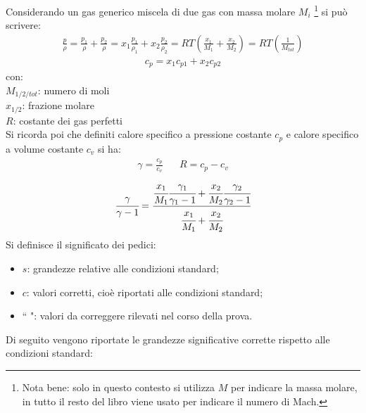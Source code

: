 Considerando un gas generico miscela di due gas con massa molare $M_i$ \footnote{Nota bene: solo in questo contesto si utilizza $M$ per indicare la massa molare, in tutto il resto del libro viene usato per indicare il numero di Mach.} si può scrivere:
\begin{align*}
\frac{p}{\rho} = \frac{p_1}{\rho} + \frac{p_2}{\rho} = x_1  \frac{p_1}{\rho_1} + x_2  \frac{p_2}{\rho_2} = RT \left( \frac{x_1}{M_1} + \frac{x_2}{M_2} \right) = RT\left(\frac{1}{M_{tot}}\right)
\end{align*}
\begin{align*}
c_p = x_1 c_{p1} + x_2 c_{p2}
\end{align*}
con:\\[1mm]
$M_{1/2/tot}$: numero di moli\\
$x_{1/2}$: frazione molare\\
$R$: costante dei gas perfetti\\[2mm]
Si ricorda poi che definiti calore specifico a pressione costante $c_p$ e calore specifico a volume costante $c_v$ si ha:
\begin{align*}
\gamma = \frac{c_p}{c_v} \;\;\;\;\;\; R = c_p - c_v
\end{align*}
\begin{align*}
\cfrac{\gamma}{\gamma -1} = \cfrac{\cfrac{x_1}{M_1} \cfrac{\gamma_1}{\gamma_1 -1}+\cfrac{x_2}{M_2} \cfrac{\gamma_2}{\gamma_2 -1}}{\cfrac{x_1}{M_1}+\cfrac{x_2}{M_2}}
\end{align*}
Si definisce il significato dei pedici:
\begin{itemize}
	\item $s$: grandezze relative alle condizioni standard;
	\item $c$: valori corretti, cioè riportati alle condizioni standard;
	\item ``  ": valori da correggere rilevati nel corso della prova.
\end{itemize}
Di seguito vengono riportate le grandezze significative corrette rispetto alle condizioni standard:
